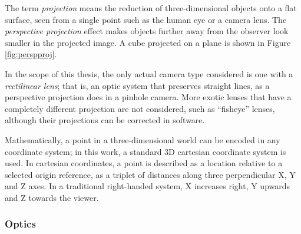 The term \emph{projection} means the reduction of three-dimensional objects onto a flat surface, seen from a single point such as the human eye or a camera lens.
The \emph{perspective projection} effect makes objects further away from the observer look smaller in the projected image.
A cube projected on a plane is shown in Figure \ref{fig:perspproj}.

In the scope of this thesis, the only actual camera type considered is one with a \emph{rectilinear lens}; that is, an optic system that preserves straight lines, as a perspective projection does in a pinhole camera. \cite{greenleaf1950photographic}
More exotic lenses that have a completely different projection are not considered, such as ``fisheye'' lenses, although their projections can be corrected in software.




Mathematically, a point in a three-dimensional world can be encoded in any coordinate system;
in this work, a standard 3D cartesian coordinate system is used.
In cartesian coordinates, a point is described as a location relative to a selected origin reference, as a triplet of distances along three perpendicular X, Y and Z axes. %
In a traditional right-handed system, X increases right, Y upwards and Z towards the viewer.



\subsubsection{Optics} %



